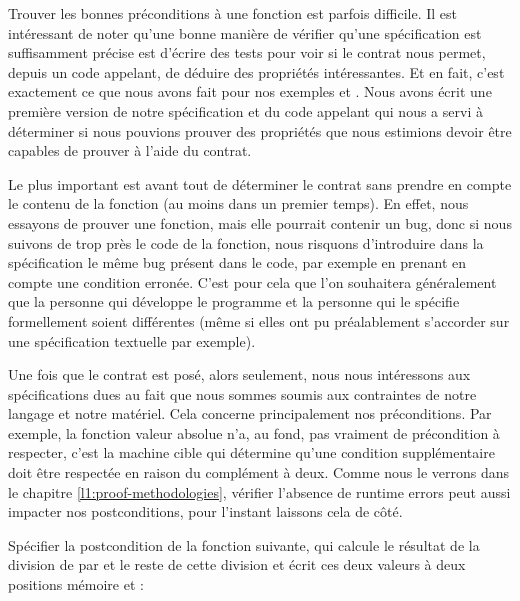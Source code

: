 

Trouver les bonnes préconditions à une fonction est parfois difficile. Il est
intéressant de noter qu'une bonne manière de vérifier qu'une spécification est
suffisamment précise est d'écrire des tests pour voir si le contrat nous permet,
depuis un code appelant, de déduire des propriétés intéressantes. Et en fait,
c'est exactement ce que nous avons fait pour nos exemples  et
. Nous avons écrit une première version de notre spécification
et du code appelant qui nous a servi à déterminer si nous pouvions prouver des
propriétés que nous estimions devoir être capables de prouver à l'aide du
contrat.



Le plus important est avant tout de déterminer le contrat sans prendre en compte
le contenu de la fonction (au moins dans un premier temps). En effet, nous
essayons de prouver une fonction, mais elle pourrait contenir un bug, donc si
nous suivons de trop près le code de la fonction, nous risquons d'introduire
dans la spécification le même bug présent dans le code, par exemple en prenant
en compte une condition erronée. C'est pour cela que
l'on souhaitera généralement que la personne qui développe le programme et la 
personne qui le spécifie formellement soient différentes (même si elles ont pu
préalablement s'accorder sur une spécification textuelle par exemple).



Une fois que le contrat est posé, alors seulement, nous nous intéressons aux
spécifications dues au fait que nous sommes soumis aux contraintes de notre langage
et notre matériel. Cela concerne principalement nos préconditions. Par exemple,
la fonction valeur absolue n'a, au fond, pas  vraiment de précondition à respecter,
c'est la machine cible qui détermine qu'une condition supplémentaire doit être
respectée en raison du complément à deux. Comme nous le verrons dans le chapitre
\ref{l1:proof-methodologies}, vérifier l'absence de runtime errors peut aussi
impacter nos postconditions, pour l'instant laissons cela de côté.






Spécifier la postcondition de la fonction suivante, qui calcule le résultat
de la division de  par  et le reste de cette
division et écrit ces deux valeurs à deux positions mémoire 
et  :



